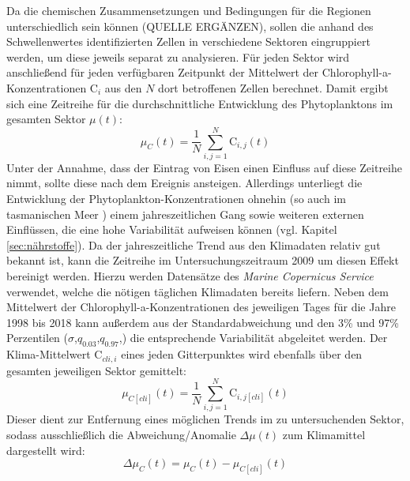 \documentclass[12pt,a4paper,onecolumn]{scrartcl}
\begin{document}
Da die chemischen Zusammensetzungen und Bedingungen für die Regionen unterschiedlich sein können (QUELLE ERGÄNZEN), sollen die anhand des Schwellenwertes identifizierten Zellen in verschiedene Sektoren eingruppiert werden, um diese jeweils separat zu analysieren. Für jeden Sektor wird anschließend für jeden verfügbaren Zeitpunkt der Mittelwert der Chlorophyll-a-Konzentrationen $\text{C}_i$ aus den $N$ dort betroffenen Zellen berechnet. Damit ergibt sich eine Zeitreihe für die durchschnittliche Entwicklung des Phytoplanktons im gesamten Sektor $\mu(t)$:
\begin{equation}
\mu_C(t) = \frac{1}{N}\sum\limits_{i,j=1}^{N} \text{C}_{i,j}(t)
\end{equation}
Unter der Annahme, dass der Eintrag von Eisen einen Einfluss auf diese Zeitreihe nimmt, sollte diese nach dem Ereignis ansteigen. Allerdings unterliegt die Entwicklung der Phytoplankton-Konzentrationen ohnehin (so auch im tasmanischen Meer \citep{Tilburg.2002}) einem jahreszeitlichen Gang sowie weiteren externen Einflüssen, die eine hohe Variabilität aufweisen können (vgl. Kapitel \ref{sec:nährstoffe}). Da der jahreszeitliche Trend aus den Klimadaten relativ gut bekannt ist, kann die Zeitreihe im Untersuchungszeitraum 2009 um diesen Effekt bereinigt werden. Hierzu werden Datensätze des \textit{Marine Copernicus Service} verwendet, welche die nötigen täglichen Klimadaten bereits liefern. Neben dem Mittelwert der Chlorophyll-a-Konzentrationen des jeweiligen Tages für die Jahre 1998 bis 2018 kann außerdem aus der Standardabweichung und den 3\% und 97\% Perzentilen ($\sigma$,$q_{0.03}$,$q_{0.97}$,) die entsprechende Variabilität abgeleitet werden. Der Klima-Mittelwert $\text{C}_{cli,i}$ eines jeden Gitterpunktes wird ebenfalls über den gesamten jeweiligen Sektor gemittelt:
\begin{equation}
\mu_{C[cli]}(t) = \frac{1}{N}\sum\limits_{i,j=1}^{N} \text{C}_{i,j[cli]}(t)
\end{equation}
Dieser dient zur Entfernung eines möglichen Trends im zu untersuchenden Sektor, sodass ausschließlich die Abweichung/Anomalie $\Delta \mu(t)$ zum Klimamittel dargestellt wird:
\begin{equation}
\Delta \mu_C(t) = \mu_C(t) - \mu_{C[cli]}(t) \label{eq:cli_anomalie}
\end{equation} 
\end{document}
